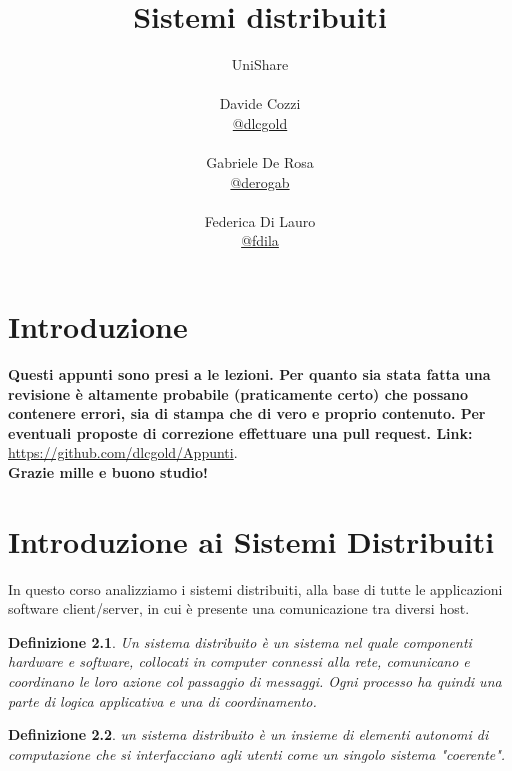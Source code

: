 \message{ !name(sd.tex)}\documentclass[a4paper,12pt, oneside]{book}
\title{Sistemi distribuiti}
\author{UniShare\\\\Davide Cozzi\\\href{https://t.me/dlcgold}{@dlcgold}\\\\Gabriele De Rosa\\\href{https://t.me/derogab}{@derogab} \\\\Federica Di Lauro\\\href{https://t.me/f_dila}{@f\textunderscore dila}}
\date{}
\begin{document}

\maketitle


\newtheorem{teorema}{Teorema}
\newtheorem{definizione}{Definizione}
\newtheorem{esempio}{Esempio}
\newtheorem{corollario}{Corollario}
\newtheorem{lemma}{Lemma}
\newtheorem{osservazione}{Osservazione}
\newtheorem{nota}{Nota}
\newtheorem{esercizio}{Esercizio}
\tableofcontents
\renewcommand{\chaptermark}[1]{%
	\markboth{\chaptername
		\ \thechapter.\ #1}{}}
\renewcommand{\sectionmark}[1]{\markright{\thesection.\ #1}}
\chapter{Introduzione}
\textbf{Questi appunti sono presi a le lezioni. Per quanto sia stata fatta una revisione è altamente probabile (praticamente certo) che possano contenere errori, sia di stampa che di vero e proprio contenuto. Per eventuali proposte di correzione effettuare una pull request. Link: } \url{https://github.com/dlcgold/Appunti}.\\
\textbf{Grazie mille e buono studio!}
\chapter{Introduzione ai Sistemi Distribuiti}
In questo corso analizziamo i sistemi distribuiti, alla base di tutte le applicazioni software 
client/server, in cui è presente una comunicazione tra diversi host.

\begin{definizione}
Un sistema distribuito è un sistema nel quale componenti hardware e software, collocati in computer
connessi alla rete, comunicano e coordinano le loro azione  col passaggio di messaggi.\newline
Ogni processo ha quindi una parte di logica applicativa e una di coordinamento. 
\end{definizione}

\begin{definizione}
un sistema distribuito è un insieme di elementi autonomi di computazione che si 
interfacciano agli utenti come un singolo sistema "coerente".
\end{definizione}
\end{document}
